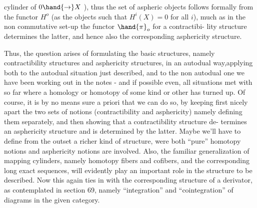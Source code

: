 
cylinder of $0\hand{\to} X$ ),  thus the  set of aspheric objects follows
formally from the functor $H^{o}$  (as the objects such that $H^{i}(X) = 0$ for all
$i$), much as in the non commutative set-up the functor $\hand{\pi}_{o}$ for a contractibi-%
lity structure determines the latter,  and hence also the corresponding
asphericity structure.

Thus,  the question arises of formulating the basic structures,
namely  contractibility structures and asphericity structures,  in an
autodual way,applying both to the autodual situation just described,  and
to the non autodual one we have been working out in the notes  -  and if
possible even,   all  situations met with so far where a homology
or homotopy  of some kind or other has turned up.  Of course,  it is by no
means sure a priori that we can do so,  by keeping first nicely apart the
two sets of notions (contractibility and asphericity) namely defining
them separately,  and then showing that a contractibility structure de-%
termines an asphericity structure\hand{,} and is determined by the latter.  Maybe
we'll have to define from the outset a richer kind of structure,  were
both ``pure'' homotopy notions and asphericity notions are involved.  Also,
the familiar generalization of mapping cylinders,  namely homotopy
fibers and cofibers,  and the corresponding long exact sequences, will
evidently play an important role in the structure to be described.  Now
this again ties in with the corresponding structure of a derivator,  as
contemplated in section 69,  namely ``integration'' and ``cointegration'' of
diagrams in the given category.

